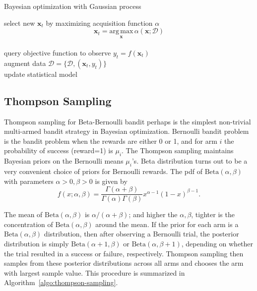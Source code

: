 \documentclass{article}
\begin{document}
\begin{algorithm}[h] \label{algo:bo}

 \caption{Bayesian optimization with Gaussian process}
  {
   select new $\mathbf{x}_{t}$ by maximizing acquisition function
   $\alpha$
   $$
     \mathbf{x}_{t} = \underset{\mathbf{x}}{\mathrm{arg \, max}} \, \alpha(\mathbf{x};\mathcal{D})
     $$\\
     query objective function to observe $y_{t} =
     f(\mathbf{x}_{t})$ \\
     augment data $\mathcal{D}=\{ \mathcal{D},
     (\mathbf{x}_{t}, y_{t}) \}$\\
     update statistical model
 }
\end{algorithm}

\subsection{Thompson Sampling}
Thompson sampling for Beta-Bernoulli bandit perhaps is the simplest non-trivial multi-armed
bandit strategy in Bayesian optimization. Bernoulli bandit problem is
the bandit problem when the rewards are either 0 or 1, and for arm $i$
the probability of success (reward=1) is $\mu_i$. The Thompson
sampling maintains Bayesian priors on the Bernoulli means
$\mu_i$'s. Beta distribution turns out to be a very convenient choice
of priors for Bernoulli rewards. The pdf of $\mathrm{Beta}(\alpha,
\beta)$ with parameters $\alpha > 0, \beta > 0$ is given by
\begin{equation}
  f(x;\alpha, \beta) = \frac{\Gamma(\alpha + \beta)}{\Gamma(\alpha)\Gamma(\beta)}x^{\alpha-1}(1-x)^{\beta-1}.
\end{equation}

The mean of $\mathrm{Beta}(\alpha,\beta)$ is $\alpha / (\alpha +
\beta)$; and higher the $\alpha, \beta$, tighter is the concentration
of $\mathrm{Beta}(\alpha,\beta)$ around the mean. If the prior
for each arm is a $\mathrm{Beta}(\alpha,\beta)$ distribution, then
after observing a Bernoulli trial, the posterior distribution is
simply $\mathrm{Beta}(\alpha + 1,\beta)$ or
$\mathrm{Beta}(\alpha,\beta +1)$, depending on whether the trial
resulted in a success or failure, respectively. Thompson sampling then
samples from these posterior distributions across all arms and chooses
the arm with largest sample value. This procedure is summarized in
Algorithm~\ref{algo:thompson-sampling}.
\end{document}
